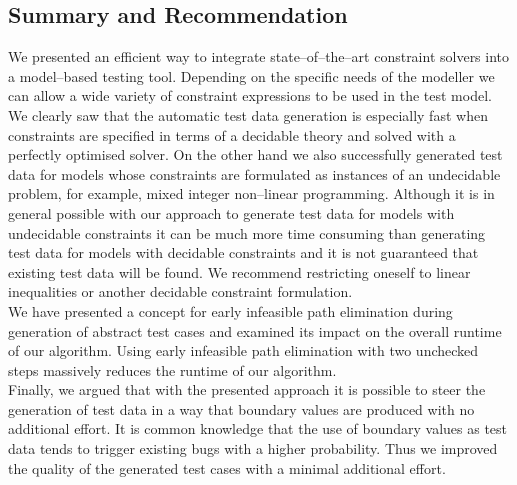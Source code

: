 \documentclass[runningheads,a4paper]{llncs}%
\begin{document}
\subsection{Summary and Recommendation}%
\label{sec:Recommendation}%
We presented an efficient way to integrate state--of--the--art constraint solvers into a model--based testing tool. Depending on the specific needs of the modeller we can allow a wide variety of constraint expressions to be used in the test model. We clearly saw that the automatic test data generation is especially fast when constraints are specified in terms of a decidable theory and solved with a perfectly optimised solver. On the other hand we also successfully generated test data for models whose constraints are formulated as instances of an undecidable problem, for example, mixed integer non--linear programming. Although it is in general possible with our approach to generate test data for models with undecidable constraints it can be much more time consuming than generating test data for models with decidable constraints and it is not guaranteed that existing test data will be found. We recommend restricting oneself to linear inequalities or another decidable constraint formulation.\\%
We have presented a concept for early infeasible path elimination during generation of abstract test cases and examined its impact on the overall runtime of our algorithm. Using early infeasible path elimination with two unchecked steps massively reduces the runtime of our algorithm.\\%
Finally, we argued that with the presented approach it is possible to steer the generation of test data in a way that boundary values are produced with no additional effort. It is common knowledge that the use of boundary values as test data tends to trigger existing bugs with a higher probability. Thus we improved the quality of the generated test cases with a minimal additional effort.%
%
%
\end{document}

